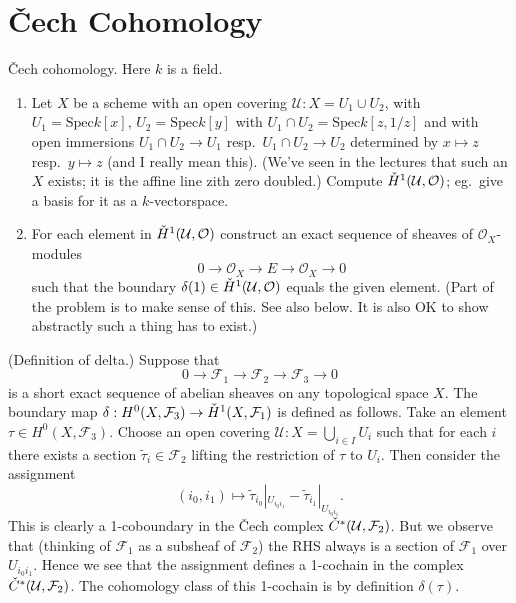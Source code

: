 \section{{\v C}ech Cohomology}
\label{section-cech-cohomology}

\begin{exercise}
{\v C}ech cohomology. Here $k$ is a field.
\begin{enumerate}
\item Let $X$ be a scheme with an open covering
${\mathcal U} : X = U_1 \cup U_2$, with $U_1 = \text{Spec} k[x]$, $U_2= \text{Spec} k[y]$
with $U_1 \cap U_2 = \text{Spec} k[z,1/z]$ and with open immersions
$U_1 \cap U_2 \to U_1$ resp.\ $U_1 \cap U_2 \to U_2$ determined
by $x \mapsto z$ resp.\ $y \mapsto z$ (and I really mean this).
(We've seen in the lectures that such an $X$ exists; it is the affine
line zith zero doubled.) Compute ${\mathaccent 20 H}^1({\mathcal U}, {\mathcal O})$;
eg.\ give a basis for it as a $k$-vectorspace.
\item For each element in
${\mathaccent 20 H}^1({\mathcal U}, {\mathcal O})$
construct an exact sequence of sheaves of ${\mathcal O}_X$-modules
$$
0 \to {\mathcal O}_X \to E \to {\mathcal O}_X \to 0
$$ 
such that the boundary $\delta(1) \in {\mathaccent 20 H}^1({\mathcal U}, {\mathcal O})$
equals the given element. (Part of the problem is to make sense of this.
See also below.
It is also OK to show abstractly such a thing has to exist.)
\end{enumerate}
\end{exercise}

\begin{definition}
(Definition of delta.) Suppose that 
$$
0 \to {\mathcal F}_1 \to {\mathcal F}_2 \to {\mathcal F}_3 \to 0
$$
is a short exact sequence of abelian sheaves on any topological space $X$.
The boundary map
$\delta : H^0(X, {\mathcal F}_3) \to {\mathaccent 20 H}^1(X, {\mathcal F}_1)$
is defined as follows. Take an element $\tau \in H^0(X, {\mathcal F}_3)$.
Choose an open covering ${\mathcal U} : X = \bigcup_{i\in I} U_i$ such
that for each $i$ there exists a section $\tilde \tau_i \in {\mathcal F}_2$
lifting the restriction of $\tau$ to $U_i$. Then consider the assignment
$$
(i_0, i_1) \longmapsto
\tilde \tau_{i_0}|_{U_{i_0i_1}} - \tilde \tau_{i_1}|_{U_{i_0i_1}}.
$$
This is clearly a 1-coboundary in the {\v C}ech complex
${\mathaccent 20 C}^\ast({\mathcal U}, {\mathcal F}_2)$. But we observe that
(thinking of ${\mathcal F}_1$ as a subsheaf of ${\mathcal F}_2$) the RHS
always is a section of ${\mathcal F}_1$ over $U_{i_0i_1}$. Hence we
see that the assignment defines a 1-cochain in the complex
${\mathaccent 20 C}^\ast({\mathcal U}, {\mathcal F}_2)$. The cohomology class of
this 1-cochain is by definition $\delta(\tau)$.
\end{definition}



